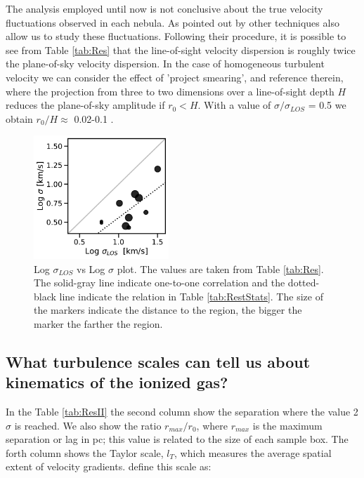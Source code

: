 \documentclass[fleqn,usenatbib, useAMS, a4paper]{mnras}
\begin{document}
The analysis employed until now is not conclusive about the true velocity fluctuations observed in each nebula. 
As pointed out by \citet{arthur2016turbulence} other techniques also allow us to study these fluctuations. 
Following their procedure, it is possible to see from Table \ref{tab:Res} that the line-of-sight velocity dispersion is roughly twice the plane-of-sky velocity dispersion.
In the case of homogeneous turbulent velocity we can consider the effect of 'project smearing', \citet{arthur2016turbulence} and reference therein, where the projection from three to two dimensions over a line-of-sight depth \(H\) reduces the plane-of-sky amplitude if \(r_{0} < H\).
With a value of \(\sigma / \sigma_{LOS}\) = 0.5 we obtain \(r_{0} / H \approx\) 0.02-0.1 \citep{1984ApJ...277..556S}. 



\begin{figure}
\centering 
\includegraphics[width=2in]{Figures/sigmas.pdf}
\caption{Log \(\sigma_{LOS}\) vs Log \(\sigma\) plot. The values are taken from Table \ref{tab:Res}. The solid-gray line indicate one-to-one correlation and the dotted-black line indicate the relation in Table \ref{tab:RestStats}. The size of the markers indicate the distance to the region, the bigger the marker the farther the region. }
\label{fig:sigvssig}
\end{figure}

\subsection{What turbulence scales can tell us about kinematics of the ionized gas?}

In the Table \ref{tab:ResII} the second column show the separation where the value 2\(\sigma\) is reached.
We also show the ratio \(r_{max}/r_{0}\), where \(r_{max}\) is the maximum separation or lag in pc; this value is related to the size of each sample box. 
The forth column shows the Taylor scale, \(l_T\), which measures the average spatial extent of velocity gradients. \citet{1999ApJ...524..895M} define this scale as:
\end{document}
